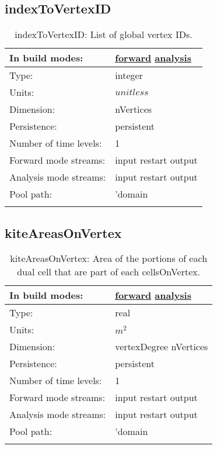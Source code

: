 \subsection[indexToVertexID]{indexToVertexID}
\label{subsec:var_sec_mesh_indexToVertexID}
\begin{center}
\begin{longtable}{| p{2.0in} | p{4.0in} |}
        \hline 
        In build modes: & \hyperref[subsec:forward_var_tab_mesh]{forward} \hyperref[subsec:analysis_var_tab_mesh]{analysis} \\
        \hline 
        Type: & integer \\
        \hline 
        Units: & $unitless$ \\
        \hline 
        Dimension: & nVertices \\
        \hline 
        Persistence: & persistent \\
        \hline 
        Number of time levels: & 1 \\
        \hline 
		 Forward mode streams: &  input restart output \\
        \hline 
		 Analysis mode streams: &  input restart output \\
        \hline 
            Pool path: & 'domain %
 \\
		 \hline 
    \caption{indexToVertexID: List of global vertex IDs.}
\end{longtable}
\end{center}
\subsection[kiteAreasOnVertex]{kiteAreasOnVertex}
\label{subsec:var_sec_mesh_kiteAreasOnVertex}
\begin{center}
\begin{longtable}{| p{2.0in} | p{4.0in} |}
        \hline 
        In build modes: & \hyperref[subsec:forward_var_tab_mesh]{forward} \hyperref[subsec:analysis_var_tab_mesh]{analysis} \\
        \hline 
        Type: & real \\
        \hline 
        Units: & $m^2$ \\
        \hline 
        Dimension: & vertexDegree nVertices \\
        \hline 
        Persistence: & persistent \\
        \hline 
        Number of time levels: & 1 \\
        \hline 
		 Forward mode streams: &  input restart output \\
        \hline 
		 Analysis mode streams: &  input restart output \\
        \hline 
            Pool path: & 'domain %
 \\
		 \hline 
    \caption{kiteAreasOnVertex: Area of the portions of each dual cell that are part of each cellsOnVertex.}
\end{longtable}
\end{center}
